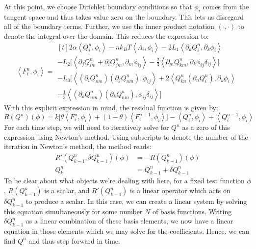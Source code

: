 \documentclass[reqno]{article}
\begin{document}
	At this point, we choose Dirichlet boundary conditions so that $\phi_i$ comes from the tangent space and thus takes value zero on the boundary.
	This lets us disregard all of the boundary terms.
	Further, we use the inner product notation $\left< \cdot, \cdot \right>$ to denote the integral over the domain.
	This reduces the expression to:
	\begin{equation}
		\left< F^n_i, \phi_i \right>
		=
		\begin{multlined}[t]
			2 \alpha \left< Q^n_i, \phi_i \right>
			- n k_B T \left< \Lambda_i, \phi_i \right>
			- 2 L_1 \left< \partial_k Q^n_i, \partial_k \phi_i \right> \\
			- L_2 \biggl[
			\left< \partial_j Q^n_{im} + \partial_i Q^n_{jm}, \partial_m \phi_{ij} \right>
			- \tfrac23 \left< \partial_m Q^n_{km}, \partial_k \phi_{ij} \delta_{ij} \right>
			\biggr] \\
			- L_3 \biggl[
			\left< (\partial_i Q^n_{nm}) (\partial_j Q^n_{nm}), \phi_{ij} \right>
			+ 2 \left< Q^n_{kn} (\partial_n Q^n_i), \partial_k \phi_i \right> \\
			- \tfrac13 \left< (\partial_k Q^n_{nm})(\partial_k Q^n_{nm}), \phi_{ij} \delta_{ij} \right>
			\biggr]
		\end{multlined}
	\end{equation}
	With this explicit expression in mind, the residual function is given by:
	\begin{equation}
		R(Q^n) (\phi) =
		k \biggl[
		\theta \left< F^n_i, \phi_i \right> 
		+ (1 - \theta) \left< F^{n - 1}_i, \phi_i \right>
		\biggr]
		- \left< Q^n_i, \phi_i \right>
		+ \left< Q^{n - 1}_i, \phi_i \right>
	\end{equation}
	For each time step, we will need to iteratively solve for $Q^n$ as a zero of this expression using Newton's method.
	Using subscripts to denote the number of the iteration in Newton's method, the method reads:
	\begin{align}
		R'(Q^n_{k - 1}, \delta Q^n_{k - 1}) (\phi)
		&= - R(Q^n_{k - 1}) (\phi) \\
		Q^n_k
		&= Q^n_{k - 1} + \delta Q^n_{k - 1}
	\end{align}
	To be clear about what objects we're dealing with here, for a fixed test function $\phi$, $R(Q^n_{k - 1})$ is a scalar, and $R'(Q^n_{k - 1})$ is a linear operator which acts on $\delta Q^n_{k - 1}$ to produce a scalar.
	In this case, we can create a linear system by solving this equation simultaneously for some number $N$ of basis functions.
	Writing $\delta Q^n_{k - 1}$ as a linear combination of these basis elements, we now have a linear equation in those elements which we may solve for the coefficients.
	Hence, we can find $Q^n$ and thus step forward in time.
	
\end{document}
